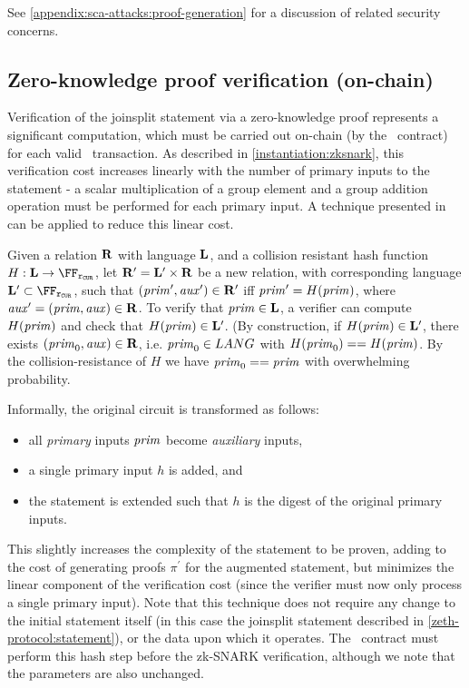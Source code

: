 See \cref{appendix:sca-attacks:proof-generation} for a discussion of related security concerns.

\subsection{Zero-knowledge proof verification (on-chain)}

Verification of the joinsplit statement via a zero-knowledge proof represents a significant computation, which must be carried out on-chain (by the \mixer~contract) for each valid \zeth~transaction. As described in \cref{instantiation:zksnark}, this verification cost increases linearly with the number of primary inputs to the statement - a scalar multiplication of a group element and a group addition operation must be performed for each primary input. A technique presented in \cite[Section 4.5.1]{GGPR13} can be applied to reduce this linear cost.

Given a relation $\mathbf{R}$ with language $\mathbf{L}$, and a collision resistant hash function $H : \LANG \to \FFx{\rCURVE}$, let $\mathbf{R}^\prime = \mathbf{L}^\prime \times \mathbf{R}$ be a new relation, with corresponding language $\LANG^\prime \subset \FFx{\rCURVE}$, such that $(\mathit{prim}^\prime, \mathit{aux}^\prime) \in \mathbf{R}^\prime$ iff $\mathit{prim}^\prime = H(\mathit{prim})$, where $\mathit{aux}^\prime = (\mathit{prim}, \mathit{aux}) \in \mathbf{R}$. To verify that $\mathit{prim} \in \mathbf{L}$, a verifier can compute $H(\mathit{prim})$ and check that $H(\mathit{prim}) \in \mathbf{L}^\prime$. (By construction, if $H(\mathit{prim}) \in \mathbf{L}^\prime$, there exists $(\mathit{prim}_0, \mathit{aux}) \in \mathbf{R}$, i.e. $\mathit{prim}_0 \in LANG$ with $H(\mathit{prim}_0) == H(\mathit{prim})$. By the collision-resistance of $H$ we have $\mathit{prim}_0 == \mathit{prim}$ with overwhelming probability.

Informally, the original circuit is transformed as follows:
\begin{itemize}
  \item all \emph{primary} inputs $\mathit{prim}$ become \emph{auxiliary} inputs,
  \item a single primary input $h$ is added, and
  \item the statement is extended such that $h$ is the digest of the original primary inputs.
\end{itemize}

This slightly increases the complexity of the statement to be proven, adding to the cost of generating proofs $\pi^\prime$ for the augmented statement, but minimizes the linear component of the verification cost (since the verifier must now only process a single primary input). Note that this technique does not require any change to the initial statement itself (in this case the joinsplit statement described in \cref{zeth-protocol:statement}), or the data upon which it operates. The \mixer~contract must perform this hash step before the zk-SNARK verification, although we note that the parameters are also unchanged.

